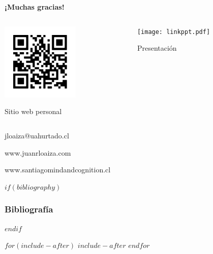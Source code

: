 \documentclass[%
    $if(fontsize)$
        $fontsize$, %
    $else$
        9pt,
    $endif$
    $if(lang)$
        $babel-lang$, %
    $endif$
    $if(papersize)$
        $papersize$paper, %
    $endif$
    $if(beamer)$
        ignorenonframetext,
        $if(handout)$
            handout, %
        $endif$
        aspectratio=$if(aspectratio)$$aspectratio$$else$169$endif$, %
    $endif$
    $for(classoption)$
        $classoption$$sep$, %
    $endfor$
]{$documentclass$}
\begin{document}
\section{}
\begin{frame}

    \centering
    {\LARGE
    \textbf{¡Muchas gracias!}}
    \vspace{-1em}

    \begin{minipage}[t]{0.7\textwidth}
    \begin{columns}
      \begin{column}{0.5\textwidth}
        \centering
        {
      \includegraphics[height=10em]{qr_juanrloaizacom.pdf}

      Sitio web personal
}
      \end{column}

      \begin{column}{0.5\textwidth}
        \centering
        {
      \texttt{[image: linkppt.pdf]}

      Presentación
}
      \end{column}
    \end{columns}
  \end{minipage}


    jloaiza@uahurtado.cl

    www.juanrloaiza.com

    www.santiagomindandcognition.cl

\end{frame}

$if(bibliography)$
\begin{frame}[allowframebreaks]
\frametitle{Bibliografía}
\printbibliography
\end{frame}
$endif$


$for(include-after)$
$include-after$
$endfor$
\end{document}
